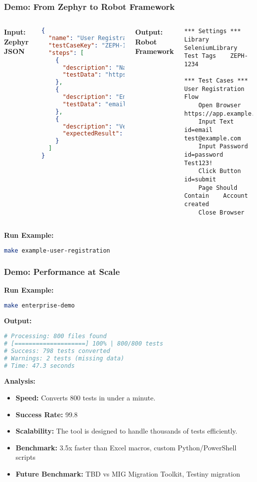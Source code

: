 \begin{frame}[fragile]
\frametitle{Demo: From Zephyr to Robot Framework}
\begin{columns}
\textbf{Input: Zephyr JSON}
\begin{lstlisting}[language=json,basicstyle=\tiny]
{
  "name": "User Registration Flow",
  "testCaseKey": "ZEPH-1234",
  "steps": [
    {
      "description": "Navigate to registration page",
      "testData": "https://app.example.com/register"
    },
    {
      "description": "Enter user details",
      "testData": "email: test@example.com, password: Test123!"
    },
    {
      "description": "Verify account creation",
      "expectedResult": "Account created successfully"
    }
  ]
}
\end{lstlisting}

\textbf{Output: Robot Framework}
\begin{lstlisting}[language=robot,basicstyle=\tiny]
*** Settings ***
Library    SeleniumLibrary
Test Tags    ZEPH-1234

*** Test Cases ***
User Registration Flow
    Open Browser    https://app.example.com/register
    Input Text    id=email    test@example.com
    Input Password    id=password    Test123!
    Click Button    id=submit
    Page Should Contain    Account created
    Close Browser
\end{lstlisting}
\end{columns}
\textbf{Run Example:}
\begin{lstlisting}[language=bash,basicstyle=\scriptsize]
make example-user-registration
\end{lstlisting}
\end{frame}

\begin{frame}[fragile]
\frametitle{Demo: Performance at Scale}
\textbf{Run Example:}
\begin{lstlisting}[language=bash,basicstyle=\scriptsize]
make enterprise-demo
\end{lstlisting}
\textbf{Output:}
\begin{lstlisting}[language=bash,basicstyle=\scriptsize]
# Processing: 800 files found
# [====================] 100% | 800/800 tests
# Success: 798 tests converted
# Warnings: 2 tests (missing data)
# Time: 47.3 seconds
\end{lstlisting}
\textbf{Analysis:}
\begin{itemize}
    \item \textbf{Speed:} Converts 800 tests in under a minute.
    \item \textbf{Success Rate:} 99.8%
    \item \textbf{Scalability:} The tool is designed to handle thousands of tests efficiently.
    \item \textbf{Benchmark:} 3.5x faster than Excel macros, custom Python/PowerShell scripts
    \item \textbf{Future Benchmark:} TBD vs MIG Migration Toolkit, Testiny migration
\end{itemize}
\end{frame}


